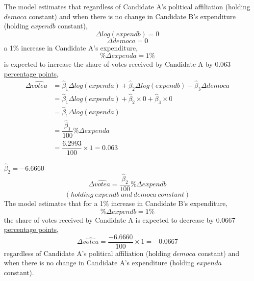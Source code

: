 \documentclass[12pt]{report}
\begin{document}
\noindent The model estimates that regardless of Candidate A’s political affiliation (holding $democa$ constant) and when there is no change in Candidate B’s expenditure (holding $expendb$ constant), $$\Delta log(expendb) = 0$$ $$\Delta democa = 0$$ a 1\% increase in Candidate A’s expenditure,
$$\%{\Delta}expenda = 1\%$$ is expected to increase the share of votes received by Candidate A  by 0.063 \uline{percentage points},
\begin{align*}
	\Delta \widehat{votea} &= \hat{\beta}_1\Delta log(expenda) + \hat{\beta}_2\Delta log(expendb) + \hat{\beta}_3\Delta democa \\
	&= \hat{\beta}_1\Delta log(expenda) + \hat{\beta}_2\times 0 + \hat{\beta}_3\times 0 \\
	&= \hat{\beta}_1\Delta log(expenda) \\
	&= \dfrac{\hat{\beta}_1}{100}\%{\Delta}expenda \\
	&= \dfrac{6.2993}{100}\times1=0.063
\end{align*}


\vspace{10mm}
\noindent $\hat{\beta}_2 = -6.6660$
$${\Delta}\widehat{votea} = \dfrac{\hat{\beta}_2}{100}\%{\Delta}expendb$$
$$(holding\ expendb\ and\ democa\ constant)$$
The model estimates that for a 1\% increase in Candidate B’s expenditure,
$$\%{\Delta}expendb = 1\%$$
the share of votes received by Candidate A is expected to decrease by 0.0667 \uline{percentage points},
$${\Delta}\widehat{votea} = \dfrac{-6.6660}{100}\times1=-0.0667$$
regardless of Candidate A’s political affiliation (holding $democa$ constant) and when there is no change in Candidate A’s expenditure (holding $expenda$ constant).
\end{document}
